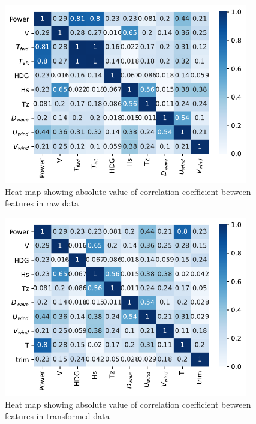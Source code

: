 \begin{figure}[H]
\begin{center}\includegraphics[width = 0.95\textwidth]{figures/heat_map_raw_data.pdf}\end{center}
\vspace{-0.7cm}
\caption{Heat map showing absolute value of correlation coefficient between features in raw data}
\label{fig:heat_map_raw_data}
\end{figure}
\begin{figure}[H]
\begin{center}\includegraphics[width = 0.95\textwidth]{figures/heat_map_data.pdf}\end{center}
\vspace{-0.7cm}
\caption{Heat map showing absolute value of correlation coefficient between features in transformed data}
\label{fig:heat_map_data}
\end{figure}
